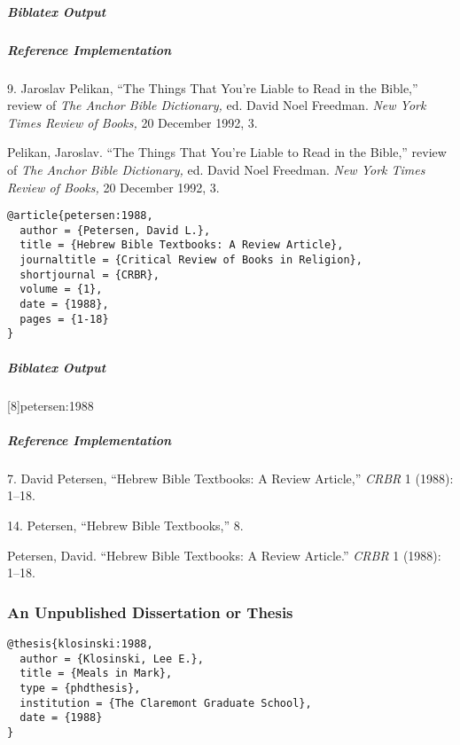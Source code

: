 \documentclass[a4paper]{article}
\newenvironment{biboutput}{%
  \subparagraph{Biblatex Output}
}{\color{black}}
\newenvironment{refimp}{%
  \subparagraph{Reference Implementation}
  \color{reference-colour}
  \rm
}{\par\color{black}}
\begin{document}
\begin{biboutput}
\end{biboutput}

\begin{refimp}
  9. Jaroslav Pelikan, “The Things That You're Liable to Read in the Bible,”
  review of \emph{The Anchor Bible Dictionary,} ed. David Noel Freedman.
  \emph{New York Times Review of Books,} 20 December 1992, 3.
  
  \hangindent\bibindent Pelikan, Jaroslav. “The Things That You're Liable to
  Read in the Bible,” review of \emph{The Anchor Bible Dictionary,} ed. David
  Noel Freedman. \emph{New York Times Review of Books,} 20 December 1992,
  3.
\end{refimp}

\begin{lstlisting}
@article{petersen:1988,
  author = {Petersen, David L.},
  title = {Hebrew Bible Textbooks: A Review Article},
  journaltitle = {Critical Review of Books in Religion},
  shortjournal = {CRBR},
  volume = {1},
  date = {1988},
  pages = {1-18}
}
\end{lstlisting}

\begin{biboutput}
  [8]{petersen:1988}
\end{biboutput}

\begin{refimp}
  7. David Petersen, “Hebrew Bible Textbooks: A Review Article,” \emph{CRBR} 1
  (1988): 1–18.

  14. Petersen, “Hebrew Bible Textbooks,” 8.

  \hangindent\bibindent Petersen, David. “Hebrew Bible Textbooks: A Review
  Article.” \emph{CRBR} 1 (1988): 1–18.

\end{refimp}

\subsubsection{An Unpublished Dissertation or Thesis}

\begin{lstlisting}
@thesis{klosinski:1988,
  author = {Klosinski, Lee E.},
  title = {Meals in Mark},
  type = {phdthesis},
  institution = {The Claremont Graduate School},
  date = {1988}
}
\end{lstlisting}  
\end{document}
